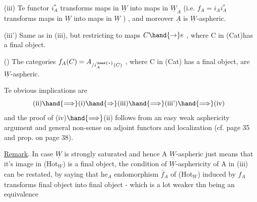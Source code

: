 (iii)  Te functor  $i_A^*$  transforms maps in $\underline{W}$  into maps in $\underline{W}_A$  (i.e.
$f_A = i_Ai_A^*$  transforms maps in $\underline{W}$ into maps in $\underline{W}$ ) ,  and moreover $\underline{A}$  is
 $\underline{W}$-aspheric.

(iii')  Same as in (iii),  but restricting to maps $C \hand{\to} e$ , where C
in (Cat)has a final object.

()  The categories   $f_A(C) = A_{/i_A^{\hand{*}}(C)}$ ,  where C in (Cat)
has a final object,  are $\underline{W}$-aspheric.

Te obvious implications are
\[ \text{(ii)}\hand{\Longrightarrow}\text{(i)}\hand{\Rightarrow}\text{(iii)}\hand{\Longrightarrow}\text{(iii')}\hand{\Longrightarrow}\text{(iv)} \]
and the proof of (iv)$\hand{\Longrightarrow}$(ii) follows from an easy weak asphericity
argument and general non-sense on adjoint functors and localization
(cf. page 35 and prop. on page 38).

\uline{Remark}.  In case $\underline{W}$  is strongly saturated\hand{,} and hence  A $\underline{W}$-aspheric
just means that it's image in (Hot$_{\underline{W}}$)  is a final object,  the condition
of $\underline{W}$-asphericity of A in (iii) can be restated,  by saying that he$_A$
endomorphism $\overline{f}_A$ of (Hot$_{\underline{W}}$) induced by $f_A$ transforms final object into
final object\hand{,}  -  which is a lot weaker thn  being an equivalence \hand{!}

